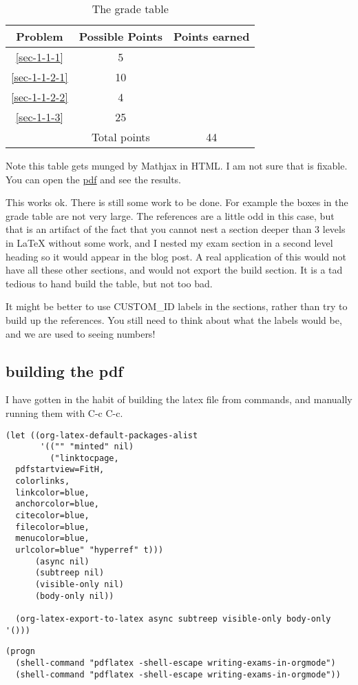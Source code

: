 \documentclass[11pt]{article}
\begin{document}
\begin{table}[htb]
\caption{The grade table}
\centering
\begin{tabular}{|c|c|c|}
\hline
Problem & Possible Points & Points earned\\
\hline
\ref{sec-1-1-1} & 5 & \\
\hline
\ref{sec-1-1-2-1} & 10 & \\
\hline
\ref{sec-1-1-2-2} & 4 & \\
\hline
\ref{sec-1-1-3} & 25 & \\
\hline
 & Total points & 44\\
\hline
\end{tabular}
\end{table}

Note this table gets munged by Mathjax in HTML. I am not sure that is fixable. You can open the \href{./writing-exams-in-orgmode.pdf}{pdf} and see the results.

This works ok. There is still some work to be done. For example the boxes in the grade table are not very large. The references are a little odd in this case, but that is an artifact of the fact that you cannot nest a section deeper than 3 levels in \LaTeX{} without some work, and I nested my exam section in a second level heading so it would appear in the blog post. A real application of this would not have all these other sections, and would not export the build section. It is a tad tedious to hand build the table, but not too bad. 

It might be better to use CUSTOM\_ID labels in the sections, rather than try to build up the references. You still need to think about what the labels would be, and we are used to seeing numbers!
\subsection{building the pdf}
\label{sec-1-3}
I have gotten in the habit of building the latex file from commands, and manually running them with C-c C-c.

\begin{verbatim}
(let ((org-latex-default-packages-alist
       '(("" "minted" nil)
         ("linktocpage,
  pdfstartview=FitH,
  colorlinks,
  linkcolor=blue,
  anchorcolor=blue,
  citecolor=blue,
  filecolor=blue,
  menucolor=blue,
  urlcolor=blue" "hyperref" t)))
      (async nil)
      (subtreep nil)
      (visible-only nil)
      (body-only nil))

  (org-latex-export-to-latex async subtreep visible-only body-only '()))
\end{verbatim}

\begin{verbatim}
(progn
  (shell-command "pdflatex -shell-escape writing-exams-in-orgmode")
  (shell-command "pdflatex -shell-escape writing-exams-in-orgmode"))
\end{verbatim}
\end{document}
